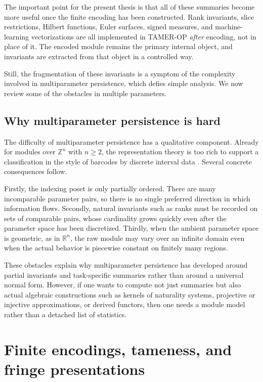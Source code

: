 \documentclass[11pt]{article}
\newcommand{\TAMER}{\textsc{TAMER-OP}}
\theoremstyle{definition}
\theoremstyle{remark}
\begin{document}
The important point for the present thesis is that all of these summaries become more useful once the finite encoding has been constructed.  Rank invariants, slice restrictions, Hilbert functions, Euler surfaces, signed measures, and machine-learning vectorizations are all implemented in \TAMER{} \emph{after} encoding, not in place of it.  The encoded module remains the primary internal object, and invariants are extracted from that object in a controlled way.

Still, the fragmentation of these invariants is a symptom of the complexity involved in multiparameter persistence, which defies simple analysis. We now review some of the obstacles in multiple parameters.

\subsection{Why multiparameter persistence is hard}

The difficulty of multiparameter persistence has a qualitative component.  Already for modules over $\mathbb{Z}^n$ with $n\geq 2$, the representation theory is too rich to support a classification in the style of barcodes by discrete interval data \cite{CZ09}.  Several concrete consequences follow.

Firstly, the indexing poset is only partially ordered.  There are many incomparable parameter pairs, so there is no single preferred direction in which information flows.  Secondly, natural invariants such as ranks must be recorded on sets of comparable pairs, whose cardinality grows quickly even after the parameter space has been discretized.  Thirdly, when the ambient parameter space is geometric, as in $\mathbb{R}^n$, the raw module may vary over an infinite domain even when the actual behavior is piecewise constant on finitely many regions.  

These obstacles explain why multiparameter persistence has developed around partial invariants and task-specific summaries rather than around a universal normal form.  However, if one wants to compute not just summaries but also actual algebraic constructions such as kernels of naturality systems, projective or injective approximations, or derived functors, then one needs a module model rather than a detached list of statistics.


\section{Finite encodings, tameness, and fringe presentations}
\end{document}
